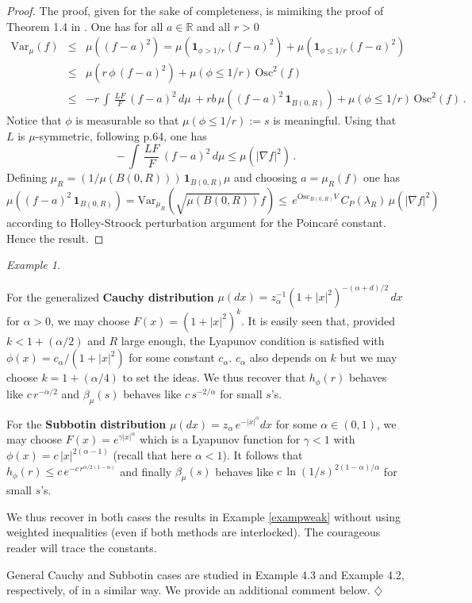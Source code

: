 \documentclass[11pt,reqno]{amsart}
\numberwithin{equation}{section}
\theoremstyle{definition}
\theoremstyle{remark}
\newtheorem{example}[theorem]{Example}
\def \Var {\textrm{Var}}
\def \Osc {\textrm{Osc}}
\begin{document}
\begin{proof}
The proof, given for the sake of completeness, is mimiking the proof of Theorem 1.4 in \cite{BBCG}. One has for all $a \in \mathbb R$ and all $r>0$
\begin{eqnarray*}
\Var_\mu(f) &\leq& \mu((f-a)^2) = \mu(\mathbf 1_{\phi>1/r} (f-a)^2)+\mu(\mathbf 1_{\phi\leq 1/r} (f-a)^2)\\ &\leq& \mu(r \, \phi \,  (f-a)^2) + \mu(\phi \leq 1/r) \, \Osc^2(f) \\ &\leq& - r \, \int \, \frac{LF}{F} \, (f-a)^2 \, d\mu \, + rb \, \mu((f-a)^2 \, \mathbf 1_{B(0,R)}) + \mu(\phi \leq 1/r) \, \Osc^2(f) \, .
\end{eqnarray*}
Notice that $\phi$ is measurable so that $\mu(\phi \leq 1/r):=s$ is meaningful. Using that $L$ is $\mu$-symmetric, following \cite{BBCG} p.64, one has $$- \, \int \, \frac{LF}{F} \, (f-a)^2 \, d\mu\leq \mu(|\nabla f|^2) \, .$$ 
Defining $\mu_R = (1/\mu(B(0,R))) \, \mathbf 1_{B(0,R)} \mu$ and choosing $a=\mu_R(f)$ one has $$\mu((f-a)^2 \, \mathbf 1_{B(0,R)})=\Var_{\mu_R}\left(\sqrt{\mu(B(0, R))}f\right) \leq \, e^{\Osc_{B(0,R)} V} \, C_P(\lambda_R) \, \mu(|\nabla f|^2)$$ according to Holley-Stroock perturbation argument for the Poincar\'e constant. Hence the result.
\end{proof}
\begin{example}\label{exampweak3}

For the generalized \textbf{Cauchy distribution} $\mu(dx)= z_\alpha^{-1} (1+|x|^2)^{- (\alpha+d)/2} \, dx$ for $\alpha>0$, we may choose $F(x)=(1+|x|^2)^k$. It is easily seen that, provided $k<1+(\alpha/2)$ and $R$ large enough, the Lyapunov condition is satisfied with $\phi(x)=c_\alpha/(1+|x|^2)$ for some constant $c_\alpha$. $c_\alpha$ also depends on $k$ but we may choose $k=1+(\alpha/4)$ to set the ideas. We thus recover that $h_\phi(r)$ behaves like $c \,  r^{-\alpha/2}$ and $\beta_\mu(s)$ behaves like $c \, s^{- 2/\alpha}$ for small $s$'s.

For the \textbf{Subbotin distribution} $\mu(dx) = z_{\alpha} \, e^{-|x|^\alpha} dx$ for some $\alpha \in (0,1)$, we may choose $F(x)=e^{\gamma |x|^\alpha}$ which is a Lyapunov function for $\gamma <1$ with $\phi(x)= c \, |x|^{2(\alpha-1)}$ (recall that here $\alpha<1$). It follows that $h_\phi(r) \leq c \, e^{-c \, r^{\alpha/2(1-\alpha)}}$ and finally $\beta_\mu(s)$ behaves like $c \, \ln(1/s)^{2(1-\alpha)/\alpha}$ for small $s$'s.

We thus recover in both cases the results in Example \ref{exampweak} without using weighted inequalities (even if both methods are interlocked). The courageous reader will trace the constants.

General Cauchy and Subbotin cases are studied in Example 4.3 and Example 4.2, respectively, of \cite{weakconvol} in a similar way. We provide an additional comment below.
\hfill $\diamondsuit$
\end{example}
\end{document}
